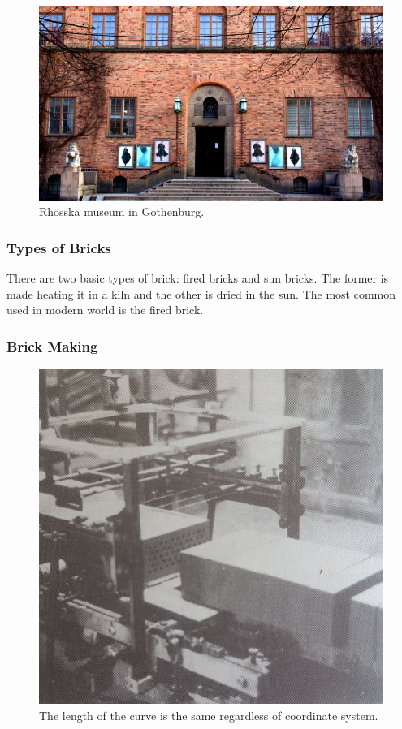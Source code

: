 \begin{figure}[H]
\centering
\includegraphics[width=1.0\linewidth ]{figure/Introduction/Rohsska.jpg}
\caption{Rhösska museum in Gothenburg.}
\end{figure}







\subsubsection{Types of Bricks}

There are two basic types of brick: fired bricks and sun bricks. The former is made heating it in a kiln and the other is dried in the sun. The most common used in modern world is the fired brick. 

\subsubsection{Brick Making}

\begin{figure}[H]
\centering
\includegraphics[width=0.9\linewidth ]{figure/Theory/wireBrick.jpg}
\caption{The length of the curve is the same regardless of coordinate system.}
\end{figure}

